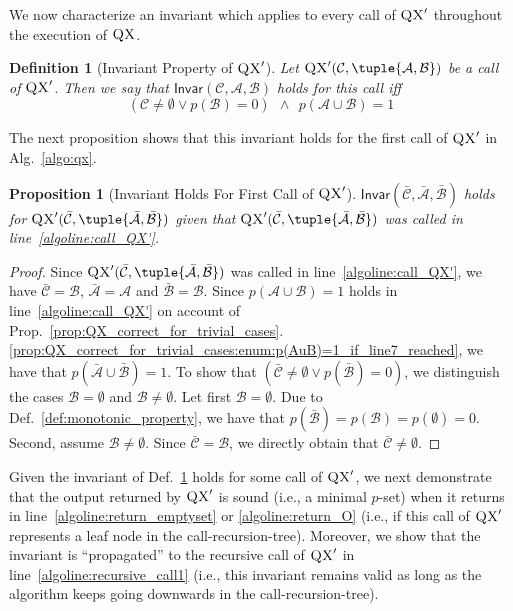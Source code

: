 \documentclass[]{elsarticle}
\newcommand{\scQX}{{\textsc{QX}}}
\newcommand{\ma}{\mathcal{A}}
\newcommand{\mb}{\mathcal{B}}
\newcommand{\mc}{\mathcal{C}}
\newcommand{\ba}{\bar{\ma}}
\newcommand{\bb}{\bar{\mb}}
\newcommand{\bc}{\bar{\mc}}
\newcommand{\Inv}{\mathsf{Invar}}
\newtheorem{definition}{Definition}[]{}
\newtheorem{proposition}{Proposition}[]{}
\begin{document}
	We now characterize 
	an invariant which applies to every call of $\scQX'$ throughout the execution of $\scQX$.  
	\begin{definition}[Invariant Property of $\scQX'$]\label{def:invariant_property}
		Let $\scQX'(\mc,\tuple{\ma,\mb})$ be a call of $\scQX'$. Then we say that $\Inv(\mc,\ma,\mb)$ holds for this call iff $$(\mc \neq \emptyset \lor p(\mb)=0) \;\,\land\;\, p(\ma \cup \mb) = 1$$
	\end{definition}
	\noindent The next proposition shows that this invariant holds for the first call of $\scQX'$ in Alg.~\ref{algo:qx}.
	\begin{proposition}[Invariant Holds For First Call of $\scQX'$]\label{prop:invar_holds_for_first_call_of_QX'}
		$\Inv(\bc,\ba,\bb)$ holds for $\scQX'(\bc,\tuple{\ba,\bb})$ given that $\scQX'(\bc,\tuple{\ba,\bb})$ was called in line~\ref{algoline:call_QX'}.
	\end{proposition}
	\begin{proof}
		Since $\scQX'(\bc,\tuple{\ba,\bb})$ was called in line~\ref{algoline:call_QX'}, we have $\bc = \mb$, $\ba = \ma$ and $\bb = \mb$. 
		Since $p(\ma\cup\mb)=1$ holds in line~\ref{algoline:call_QX'} on account of  Prop.~\ref{prop:QX_correct_for_trivial_cases}.\ref{prop:QX_correct_for_trivial_cases:enum:p(AuB)=1_if_line7_reached}, we have that $p(\ba\cup\bb)=1$. To show that $(\bc\neq\emptyset \lor p(\bb)=0)$, we distinguish the cases $\mb = \emptyset$ and $\mb \neq \emptyset$.
		Let first $\mb = \emptyset$. Due to Def.~\ref{def:monotonic_property}, we have that $p(\bb)=p(\mb)=p(\emptyset)=0$.
		Second, assume $\mb \neq \emptyset$. Since $\bc = \mb$, we directly obtain that $\bc \neq \emptyset$.	
	\end{proof}
	\noindent Given the invariant of Def.~\ref{def:invariant_property} holds for some call of $\scQX'$, we next demonstrate that the output returned by $\scQX'$ is sound (i.e., a minimal $p$-set) when it returns in line~\ref{algoline:return_emptyset} or \ref{algoline:return_O} (i.e., if this call of $\scQX'$ represents a leaf node in the call-recursion-tree). Moreover, we show that the invariant is ``propagated'' to the recursive call of $\scQX'$ in line~\ref{algoline:recursive_call1} (i.e., this invariant remains valid as long as the algorithm keeps going downwards in the call-recursion-tree). 
\end{document}
